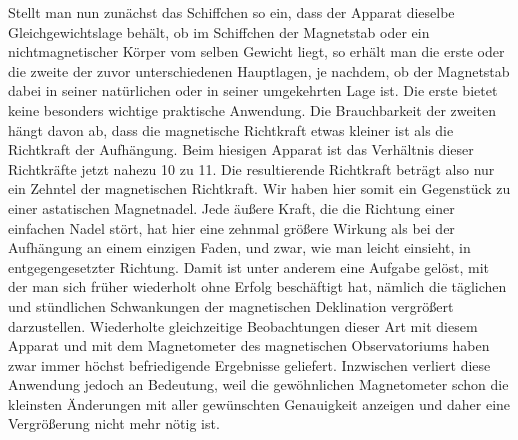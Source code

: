 Stellt man nun zunächst das Schiffchen so ein, dass der Apparat dieselbe Gleichgewichtslage behält, ob im Schiffchen der Magnetstab oder ein nichtmagnetischer Körper vom selben Gewicht liegt, so erhält man die erste oder die zweite der zuvor unterschiedenen Hauptlagen, je nachdem, ob der Magnetstab dabei in seiner natürlichen oder in seiner umgekehrten Lage ist. Die erste bietet keine besonders wichtige praktische Anwendung. Die Brauchbarkeit der zweiten hängt davon ab, dass die magnetische Richtkraft etwas kleiner ist als die Richtkraft der Aufhängung. Beim hiesigen Apparat ist das Verhältnis dieser Richtkräfte jetzt nahezu 10 zu 11. Die resultierende Richtkraft beträgt also nur ein Zehntel der magnetischen Richtkraft. Wir haben hier somit ein Gegenstück zu einer astatischen Magnetnadel. Jede äußere Kraft, die die Richtung einer einfachen Nadel stört, hat hier eine zehnmal größere Wirkung als bei der Aufhängung an einem einzigen Faden, und zwar, wie man leicht einsieht, in entgegengesetzter Richtung. Damit ist unter anderem eine Aufgabe gelöst, mit der man sich früher wiederholt ohne Erfolg beschäftigt hat, nämlich die täglichen und stündlichen Schwankungen der magnetischen Deklination vergrößert darzustellen. Wiederholte gleichzeitige Beobachtungen dieser Art mit diesem Apparat und mit dem Magnetometer des magnetischen Observatoriums haben zwar immer höchst befriedigende Ergebnisse geliefert. Inzwischen verliert diese Anwendung jedoch an Bedeutung, weil die gewöhnlichen Magnetometer schon die kleinsten Änderungen mit aller gewünschten Genauigkeit anzeigen und daher eine Vergrößerung nicht mehr nötig ist.

